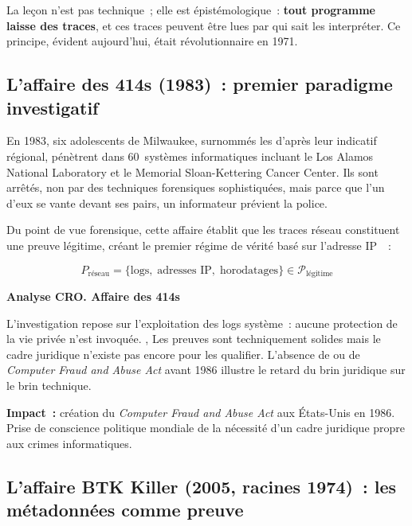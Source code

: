 \medskip

La leçon n'est pas technique~; elle est épistémologique~: \textbf{tout
programme laisse des traces}, et ces traces peuvent être lues par qui sait
les interpréter. Ce principe, évident aujourd'hui, était révolutionnaire
en 1971.

\subsection{L'affaire des 414s (1983)~: premier paradigme investigatif}

En 1983, six adolescents de Milwaukee, surnommés les  d'après
leur indicatif régional, pénètrent dans 60~systèmes informatiques incluant le
Los Alamos National Laboratory et le Memorial Sloan-Kettering Cancer Center.
Ils sont arrêtés, non par des techniques forensiques sophistiquées, mais parce
que l'un d'eux se vante devant ses pairs, un informateur prévient la police.

\medskip

Du point de vue forensique, cette affaire établit que les traces réseau
constituent une preuve légitime, créant le premier régime de vérité basé
sur l'adresse IP~\cite{pollitt2010history}~:

\begin{equation}
P_{\text{réseau}} = \bigl\{\text{logs},\; \text{adresses IP},\;
\text{horodatages}\bigr\} \in \mathcal{P}_{\text{légitime}}
\label{eq:preuve-reseau}
\end{equation}

\begin{boxCRO}
\textbf{Analyse CRO. Affaire des 414s}

L'investigation repose sur l'exploitation des logs système~: aucune protection
de la vie privée n'est invoquée. \cro{$\downarrow$}{$\uparrow$}{$\downarrow$},
Les preuves sont techniquement solides mais le cadre juridique n'existe pas encore
pour les qualifier. L'absence de \loicam{} ou de \textit{Computer Fraud and Abuse
Act} avant 1986 illustre le retard du brin juridique sur le brin technique.
\end{boxCRO}

\textbf{Impact~:} création du \textit{Computer Fraud and Abuse Act} aux
États-Unis en 1986. Prise de conscience politique mondiale de la nécessité
d'un cadre juridique propre aux crimes informatiques.

\subsection{L'affaire BTK Killer (2005, racines 1974)~: les métadonnées comme preuve}

